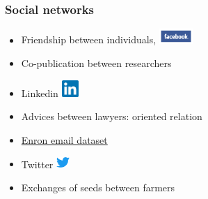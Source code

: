 \documentclass[compress,10pt]{beamer}
\begin{document}
 

\begin{frame} \frametitle{Social networks}
\begin{itemize}
\item Friendship between individuals,  \includegraphics[width=0.1\textwidth]{plots/facebook.png} 
\item Co-publication between researchers   
\item Linkedin \includegraphics[width=0.05\textwidth]{plots/linkedIn.png} 
\item Advices between lawyers: \alert{oriented relation}
\item \href{https://www.cs.cmu.edu/~./enron/}{Enron email dataset}
\item Twitter \includegraphics[width=0.5cm]{plots/twitter.png}
\item Exchanges of seeds between farmers
\end{itemize}


\end{frame}
\end{document}
